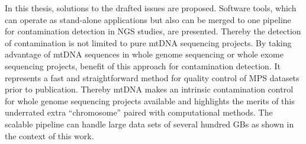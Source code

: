 In this thesis, solutions to the drafted issues are proposed. Software tools, which can operate as stand-alone applications but also can be merged to one pipeline for contamination detection in NGS studies, are presented. Thereby the detection of contamination is not limited to pure mtDNA sequencing projects. By taking advantage of  mtDNA sequences in whole genome sequencing or whole exome sequencing projects, benefit of this approach for contamination detection. It represents a fast and straightforward method for quality control of MPS datasets prior to publication. Thereby mtDNA makes an intrinsic contamination control for whole genome sequencing projects available and highlights the merits of this underrated extra “chromosome” paired with computational methods. The scalable pipeline can handle large data sets of several hundred GBs as shown in the context of this work. 

